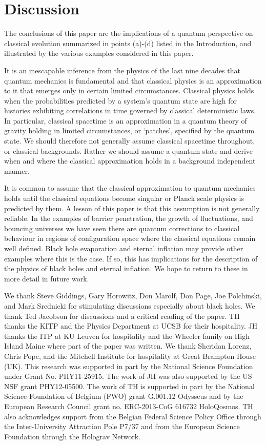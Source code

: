 \documentclass[prd,floats,superscriptaddress,eqsecnum,floatfix,nofootinbib,12pt]{revtex4}
\def\j2{}
\def\nf{}
\begin{document}
{{{{%
\section{Discussion}
\label{conclusions}
{\j2 The conclusions of this paper are the implications  of a quantum perspective on classical evolution summarized in points (a)-(d)  listed in the Introduction, and illustrated by the various examples considered in this paper. } 

It is an inescapable inference from the physics of the last nine decades that quantum mechanics is fundamental and that classical physics is an approximation to it that emerges only in certain limited circumstances.{\j2 Classical physics holds when the probabilities predicted by a system's quantum state are high for histories exhibiting correlations in time governed by classical deterministic laws. In particular, classical spacetime is an approximation in a quantum theory of gravity holding in limited circumstances, {\nf or `patches'}, specified by the quantum state.} We should therefore not generally assume classical spacetime throughout, or classical backgrounds. Rather we should assume a quantum state and derive when and where the classical approximation holds in a background independent manner.  

It is common to assume that the classical approximation to quantum mechanics holds until the classical equations become singular or Planck scale physics is predicted by them. A lesson of this paper is that this assumption is not generally reliable. In the examples of barrier penetration, the growth of fluctuations, and bouncing universes {\nf we have seen there are quantum corrections to classical behaviour} in regions of configuration space where the classical equations remain well defined.{\j2 Black hole evaporation and eternal inflation may provide other examples where this is the case. If so, this has implications for the description of  the physics of black holes and eternal inflation.} We hope to return to these in more detail in future work.


\acknowledgments
We thank Steve Giddings, Gary Horowitz, Don Marolf, {\j2 Don Page,} Joe Polchinski, and Mark Srednicki for stimulating discussions especially about black holes. We thank Ted Jacobson for discussions and a critical reading of the paper. TH thanks the KITP and the Physics Department at UCSB for their hospitality.  JH thanks the ITP at KU Leuven for hospitality and the Wheeler family on High Island Maine where part of the paper was written. We thank Sheridan Lorenz, Chris Pope, and the Mitchell Institute for hospitality at Great Brampton House (UK). This research was  supported in part by the National Science Foundation under Grant No. PHY11-25915. The work of JH was also supported by the US NSF grant PHY12-05500. The work of TH is supported in part by the National Science Foundation of Belgium (FWO) grant G.001.12 Odysseus and by the European Research Council grant no. ERC-2013-CoG 616732 HoloQosmos. TH also acknowledges support from the Belgian Federal Science Policy Office through the Inter-University Attraction Pole P7/37 and from the European Science Foundation through the Holograv Network.

}}}}
\end{document}
